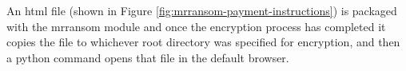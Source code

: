 \documentclass[12pt]{article}
\begin{document}
    An html file (shown in Figure  \ref{fig:mrransom-payment-instructions}) is packaged with the mrransom module and once the encryption process has completed it copies the file to whichever root directory was specified for encryption, and then a python command opens that file in the default browser.

\newpage



\end{document}
